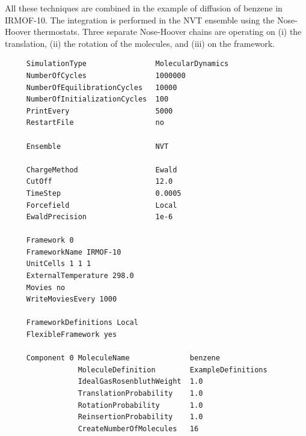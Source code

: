 All these techniques are combined in the example of diffusion of benzene in IRMOF-10. The integration is performed in the NVT ensemble using the Nose-Hoover thermostats.
Three separate Nose-Hoover chains are operating on (i) the translation, (ii) the rotation of the molecules, and (iii) on the framework.

\begin{tiny}
\begin{verbatim}
     SimulationType                MolecularDynamics
     NumberOfCycles                1000000
     NumberOfEquilibrationCycles   10000
     NumberOfInitializationCycles  100
     PrintEvery                    5000
     RestartFile                   no
     
     Ensemble                      NVT
     
     ChargeMethod                  Ewald
     CutOff                        12.0
     TimeStep                      0.0005
     Forcefield                    Local
     EwaldPrecision                1e-6
     
     Framework 0
     FrameworkName IRMOF-10
     UnitCells 1 1 1
     ExternalTemperature 298.0
     Movies no
     WriteMoviesEvery 1000
     
     FrameworkDefinitions Local
     FlexibleFramework yes
     
     Component 0 MoleculeName              benzene
                 MoleculeDefinition        ExampleDefinitions
                 IdealGasRosenbluthWeight  1.0
                 TranslationProbability    1.0
                 RotationProbability       1.0
                 ReinsertionProbability    1.0
                 CreateNumberOfMolecules   16
\end{verbatim}
\end{tiny}

